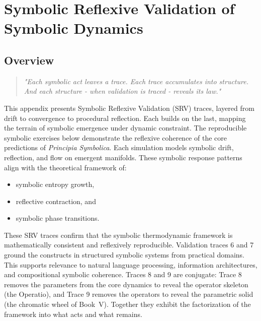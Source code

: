 ﻿\clearpage
{}
\chapter{Symbolic Reflexive Validation of Symbolic Dynamics}
\section*{Overview}
\label{sec:appB_overview}
\begin{quote}
\emph{"Each symbolic act leaves a trace.  
Each trace accumulates into structure.  
And each structure - when validation is traced - reveals its law."}
\end{quote}
\vspace{1em}
This appendix presents Symbolic Reflexive Validation (SRV) traces, layered from drift to convergence to procedural reflection.  
Each builds on the last, mapping the terrain of symbolic emergence under dynamic constraint.
The reproducible symbolic exercises below demonstrate the reflexive coherence  
of the core predictions of \emph{Principia Symbolica}.  
Each simulation models symbolic drift, reflection, and flow on emergent manifolds.
These symbolic response patterns align with the theoretical framework of:
\begin{itemize}
  \item symbolic entropy growth,
  \item reflective contraction, and
  \item symbolic phase transitions.
\end{itemize}
These SRV traces confirm that the symbolic thermodynamic framework is
mathematically consistent and reflexively reproducible.
Validation traces 6 and 7 ground the constructs in structured symbolic systems
from practical domains.
This supports relevance to natural language processing, information
architectures, and compositional symbolic coherence.
Traces 8 and 9 are conjugate: Trace 8 removes the parameters from the core
dynamics to reveal the operator skeleton (the Operatio), and Trace 9 removes
the operators to reveal the parametric solid (the chromatic wheel of
Book~V). Together they exhibit the factorization of the framework into what
acts and what remains.
